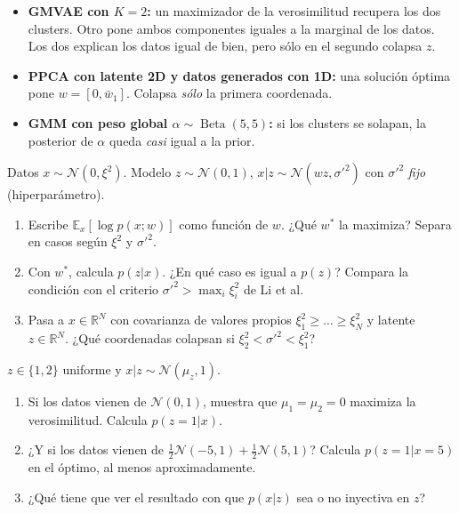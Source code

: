 \documentclass[11pt,a4paper]{article}
\newcommand{\E}{\mathbb{E}}
\newcommand{\R}{\mathbb{R}}
\newcommand{\N}{\mathcal{N}}
\begin{document}
\begin{evidencia}
\begin{itemize}[leftmargin=*]
  \item \textbf{GMVAE con $K=2$:} un maximizador de la verosimilitud recupera los dos clusters. Otro pone ambos componentes iguales a la marginal de los datos. Los dos explican los datos igual de bien, pero sólo en el segundo colapsa $z$.
  \item \textbf{PPCA con latente 2D y datos generados con 1D:} una solución óptima pone $w=[0,\bar w_1]$. Colapsa \emph{sólo} la primera coordenada.
  \item \textbf{GMM con peso global $\alpha\sim\operatorname{Beta}(5,5)$:} si los clusters se solapan, la posterior de $\alpha$ queda \emph{casi} igual a la prior.
\end{itemize}
\end{evidencia}

\begin{guia}
Datos $x\sim\N(0,\xi^2)$. Modelo $z\sim\N(0,1)$, $x|z\sim\N(wz,\sigma'^2)$ con $\sigma'^2$ \emph{fijo} (hiperparámetro).
\begin{enumerate}[leftmargin=*]
  \item Escribe $\E_{x}[\log p(x;w)]$ como función de $w$. ¿Qué $w^\ast$ la maximiza? Separa en casos según $\xi^2$ y $\sigma'^2$.
  \item Con $w^\ast$, calcula $p(z|x)$. ¿En qué caso es igual a $p(z)$? Compara la condición con el criterio $\sigma'^2>\max_i\xi_i^2$ de Li et al.
  \item Pasa a $x\in\R^N$ con covarianza de valores propios $\xi_1^2\ge\dots\ge\xi_N^2$ y latente $z\in\R^N$. ¿Qué coordenadas colapsan si $\xi_2^2<\sigma'^2<\xi_1^2$?
\end{enumerate}
\end{guia}

\begin{guia}
$z\in\{1,2\}$ uniforme y $x|z\sim\N(\mu_z,1)$.
\begin{enumerate}[leftmargin=*]
  \item Si los datos vienen de $\N(0,1)$, muestra que $\mu_1=\mu_2=0$ maximiza la verosimilitud. Calcula $p(z=1|x)$.
  \item ¿Y si los datos vienen de $\tfrac12\N(-5,1)+\tfrac12\N(5,1)$? Calcula $p(z=1|x=5)$ en el óptimo, al menos aproximadamente.
  \item ¿Qué tiene que ver el resultado con que $p(x|z)$ sea o no inyectiva en $z$?
\end{enumerate}
\end{guia}
\end{document}
